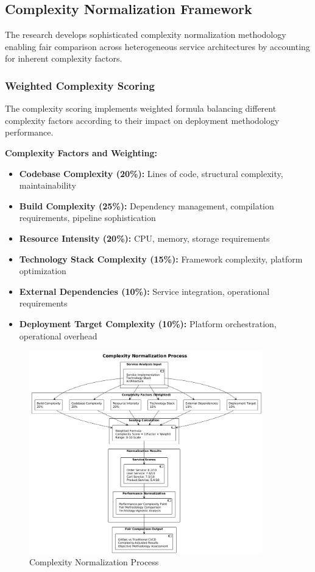 \subsection{Complexity Normalization Framework}

The research develops sophisticated complexity normalization methodology enabling fair comparison across heterogeneous service architectures by accounting for inherent complexity factors.

\subsubsection{Weighted Complexity Scoring}

The complexity scoring implements weighted formula balancing different complexity factors according to their impact on deployment methodology performance.

\textbf{Complexity Factors and Weighting:}
\begin{itemize}
\item \textbf{Codebase Complexity (20\%):} Lines of code, structural complexity, maintainability
\item \textbf{Build Complexity (25\%):} Dependency management, compilation requirements, pipeline sophistication
\item \textbf{Resource Intensity (20\%):} CPU, memory, storage requirements
\item \textbf{Technology Stack Complexity (15\%):} Framework complexity, platform optimization
\item \textbf{External Dependencies (10\%):} Service integration, operational requirements
\item \textbf{Deployment Target Complexity (10\%):} Platform orchestration, operational overhead
\end{itemize}

\begin{figure}[h]
\centering
\includegraphics[width=0.9\textwidth]{figures/Complexity-Normalization-Process.png}
\caption{Complexity Normalization Process}
\label{fig:complexity-normalization-process}
\end{figure}

